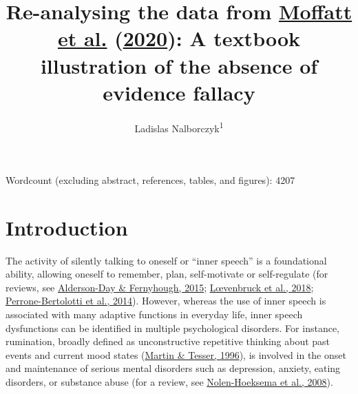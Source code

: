 \documentclass[
  english,
  man, donotrepeattitle,floatsintext]{apa6}
\title{Re-analysing the data from \protect\hyperlink{ref-moffatt_inner_2020}{Moffatt et al.} (\protect\hyperlink{ref-moffatt_inner_2020}{2020}): A textbook illustration of the absence of evidence fallacy}
\author{Ladislas Nalborczyk\textsuperscript{1}}
\date{}
\affiliation{\vspace{0.5cm}\textsuperscript{1} Univ. Grenoble Alpes, CNRS, Grenoble INP, GIPSA-lab, 38000 Grenoble, France}
\begin{document}
\maketitle

Wordcount (excluding abstract, references, tables, and figures): 4207

\newpage

\hypertarget{introduction}{%
\section{Introduction}\label{introduction}}

The activity of silently talking to oneself or ``inner speech'' is a foundational ability, allowing oneself to remember, plan, self-motivate or self-regulate (for reviews, see \protect\hyperlink{ref-alderson-day_inner_2015}{Alderson-Day \& Fernyhough, 2015}; \protect\hyperlink{ref-loevenbruck_cognitive_2018}{Lœvenbruck et al., 2018}; \protect\hyperlink{ref-perrone-bertolotti_what_2014}{Perrone-Bertolotti et al., 2014}). However, whereas the use of inner speech is associated with many adaptive functions in everyday life, inner speech dysfunctions can be identified in multiple psychological disorders. For instance, rumination, broadly defined as unconstructive repetitive thinking about past events and current mood states (\protect\hyperlink{ref-Martin}{Martin \& Tesser, 1996}), is involved in the onset and maintenance of serious mental disorders such as depression, anxiety, eating disorders, or substance abuse (for a review, see \protect\hyperlink{ref-Nolen-Hoeksema2008}{Nolen-Hoeksema et al., 2008}).
\end{document}
